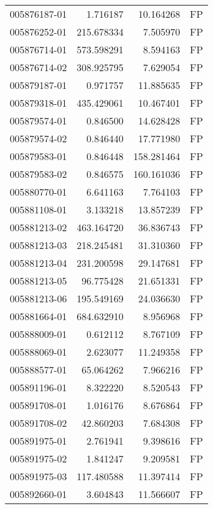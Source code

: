 \begin{tabular}{lrrl}
005876187-01 &    1.716187 &      10.164268 &   FP \\
005876252-01 &  215.678334 &       7.505970 &   FP \\
005876714-01 &  573.598291 &       8.594163 &   FP \\
005876714-02 &  308.925795 &       7.629054 &   FP \\
005879187-01 &    0.971757 &      11.885635 &   FP \\
005879318-01 &  435.429061 &      10.467401 &   FP \\
005879574-01 &    0.846500 &      14.628428 &   FP \\
005879574-02 &    0.846440 &      17.771980 &   FP \\
005879583-01 &    0.846448 &     158.281464 &   FP \\
005879583-02 &    0.846575 &     160.161036 &   FP \\
005880770-01 &    6.641163 &       7.764103 &   FP \\
005881108-01 &    3.133218 &      13.857239 &   FP \\
005881213-02 &  463.164720 &      36.836743 &   FP \\
005881213-03 &  218.245481 &      31.310360 &   FP \\
005881213-04 &  231.200598 &      29.147681 &   FP \\
005881213-05 &   96.775428 &      21.651331 &   FP \\
005881213-06 &  195.549169 &      24.036630 &   FP \\
005881664-01 &  684.632910 &       8.956968 &   FP \\
005888009-01 &    0.612112 &       8.767109 &   FP \\
005888069-01 &    2.623077 &      11.249358 &   FP \\
005888577-01 &   65.064262 &       7.966216 &   FP \\
005891196-01 &    8.322220 &       8.520543 &   FP \\
005891708-01 &    1.016176 &       8.676864 &   FP \\
005891708-02 &   42.860203 &       7.684308 &   FP \\
005891975-01 &    2.761941 &       9.398616 &   FP \\
005891975-02 &    1.841247 &       9.209581 &   FP \\
005891975-03 &  117.480588 &      11.397414 &   FP \\
005892660-01 &    3.604843 &      11.566607 &   FP \\

\end{tabular}
